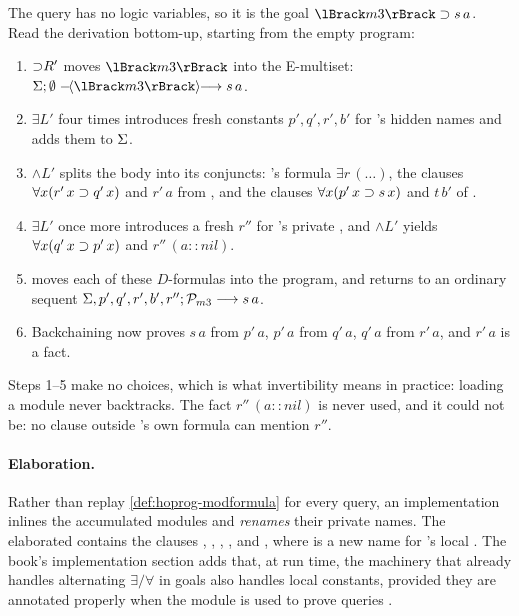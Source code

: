 \begin{tutorial}
The query has no logic variables, so it is the goal $\hoprogT{m3}\imp s\,a$. Read the derivation
bottom-up, starting from the empty program:
\begin{enumerate}
\item ${\supset}R'$ moves $\hoprogT{m3}$ into the E-multiset: $\hoprogE{\Sig}{\emptyset}{\hoprogT{m3}}{s\,a}$.
\item $\exists L'$ four times introduces fresh constants $p',q',r',b'$ for 's hidden names and
  adds them to $\Sigma$.
\item $\wedge L'$ splits the body into its conjuncts: 's formula
  $\exists r\,(\ldots)$, the clauses $\forall x(r'\,x\supset q'\,x)$ and $r'\,a$ from , and the
  clauses $\forall x(p'\,x\supset s\,x)$ and $t\,b'$ of .
\item $\exists L'$ once more introduces a fresh $r''$ for 's private , and $\wedge L'$
  yields $\forall x(q'\,x\supset p'\,x)$ and $r''\,(a::nil)$.
\item {} moves each of these $D$-formulas into the program, and 
  returns to an ordinary sequent $\Sigma,p',q',r',b',r'';\mathcal{P}_{m3}\longrightarrow s\,a$.
\item Backchaining now proves $s\,a$ from $p'\,a$, $p'\,a$ from $q'\,a$, $q'\,a$ from $r'\,a$, and
  $r'\,a$ is a fact.
\end{enumerate}
Steps 1--5 make no choices, which is what invertibility means in practice: loading a module never
backtracks. The fact $r''\,(a::nil)$ is never used, and it could not be: no clause outside 's
own formula can mention $r''$.
\end{tutorial}

\paragraph{Elaboration.} Rather than replay \cref{def:hoprog-modformula} for every query, an implementation
inlines the accumulated modules and \emph{renames} their private names. The elaborated  contains
the clauses , , , ,  and
, where  is a new name for 's local  . The book's implementation
section adds that, at run time, the machinery that already handles alternating $\exists/\forall$ in
goals also handles local constants, provided they are annotated properly when the module is used to
prove queries .

